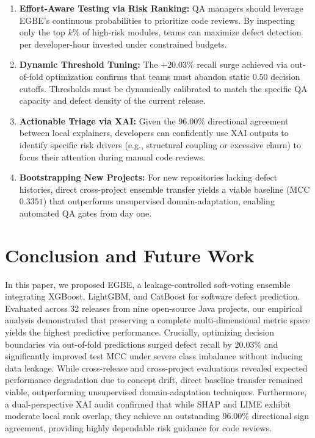 \documentclass[conference]{IEEEtran}
\begin{document}
\begin{enumerate}
    \item \textbf{Effort-Aware Testing via Risk Ranking:} QA managers should leverage EGBE's continuous probabilities to prioritize code reviews. By inspecting only the top $k$\% of high-risk modules, teams can maximize defect detection per developer-hour invested under constrained budgets.
    
    \item \textbf{Dynamic Threshold Tuning:} The $+20.03\%$ recall surge achieved via out-of-fold optimization confirms that teams must abandon static $0.50$ decision cutoffs. Thresholds must be dynamically calibrated to match the specific QA capacity and defect density of the current release.
    
    \item \textbf{Actionable Triage via XAI:} Given the $96.00\%$ directional agreement between local explainers, developers can confidently use XAI outputs to identify specific risk drivers (e.g., structural coupling or excessive churn) to focus their attention during manual code reviews.
    
    \item \textbf{Bootstrapping New Projects:} For new repositories lacking defect histories, direct cross-project ensemble transfer yields a viable baseline (MCC $0.3351$) that outperforms unsupervised domain-adaptation, enabling automated QA gates from day one.
\end{enumerate}


\section{Conclusion and Future Work}
\label{sec:conclusion}

In this paper, we proposed EGBE, a leakage-controlled soft-voting ensemble integrating XGBoost, LightGBM, and CatBoost for software defect prediction. Evaluated across 32 releases from nine open-source Java projects, our empirical analysis demonstrated that preserving a complete multi-dimensional metric space yields the highest predictive performance. Crucially, optimizing decision boundaries via out-of-fold predictions surged defect recall by $20.03\%$ and significantly improved test MCC under severe class imbalance without inducing data leakage. While cross-release and cross-project evaluations revealed expected performance degradation due to concept drift, direct baseline transfer remained viable, outperforming unsupervised domain-adaptation techniques. Furthermore, a dual-perspective XAI audit confirmed that while SHAP and LIME exhibit moderate local rank overlap, they achieve an outstanding $96.00\%$ directional sign agreement, providing highly dependable risk guidance for code reviews.
\end{document}
